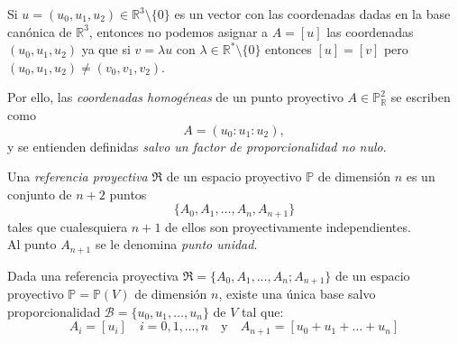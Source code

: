 Si $u = (u_0, u_1, u_2) \in \mathbb{R}^3 \setminus \{0\}$ es un vector con las coordenadas dadas en la base canónica de $\mathbb{R}^3$, entonces no podemos asignar a $A = [u]$ las coordenadas $(u_0, u_1, u_2)$ ya que si $v = \lambda u$ con $\lambda \in \mathbb{R}^* \setminus \{0\}$ entonces $[u] = [v]$ pero $(u_0, u_1, u_2) \neq (v_0, v_1, v_2)$.

Por ello, las \emph{coordenadas homogéneas} de un punto proyectivo
\(A \in \mathbb{P}^2_{\mathbb{R}}\) se escriben como
\[
A = (u_0 : u_1 : u_2),
\]
y se entienden definidas \emph{salvo un factor de proporcionalidad no nulo}.


\begin{definición} 
    Una \emph{referencia proyectiva} \(\mathfrak{R}\) de un espacio proyectivo 
    \(\mathbb{P}\) de dimensión \(n\) es un conjunto de \(n+2\) puntos
    \[
    \{A_0, A_1, \ldots, A_n, A_{n+1}\} 
    \]
    tales que cualesquiera \(n+1\) de ellos son proyectivamente independientes.\\
    Al punto \(A_{n+1}\) se le denomina \emph{punto unidad}.
\end{definición}


\begin{proposición}
    Dada una referencia proyectiva $\mathfrak{R} = \{A_0, A_1, \ldots, A_n; A_{n+1}\}$ de un espacio proyectivo $\mathbb{P} = \mathbb{P}(V)$ de dimensión $n$, existe una única base salvo proporcionalidad $\mathcal{B} = \{u_0, u_1, \ldots, u_n\}$ de $V$ tal que:
    \[
    A_i = [u_i] \quad i=0,1,\ldots,n \quad \text{y} \quad A_{n+1} = [u_0 + u_1 + \ldots + u_n]
    \]
\end{proposición}


